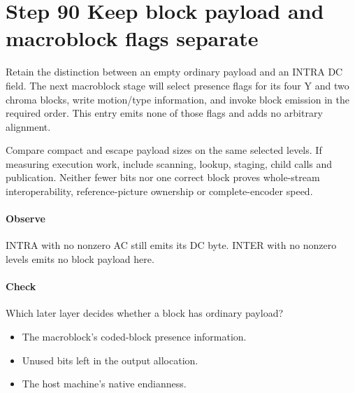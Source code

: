 \section{Step 90 Keep block payload and macroblock flags separate}\label{h263-coeff-s10}
Retain the distinction between an empty ordinary payload and an INTRA DC field.
The next macroblock stage will select presence flags for its four Y and two chroma
blocks, write motion/type information, and invoke block emission in the required
order. This entry emits none of those flags and adds no arbitrary alignment.

Compare compact and escape payload sizes on the same selected levels. If measuring
execution work, include scanning, lookup, staging, child calls and publication.
Neither fewer bits nor one correct block proves whole-stream interoperability,
reference-picture ownership or complete-encoder speed.

\paragraph{Observe} INTRA with no nonzero AC still emits its DC byte. INTER with
no nonzero levels emits no block payload here.
\paragraph{Check} Which later layer decides whether a block has ordinary payload?
\begin{itemize}
  \item[A.] The macroblock's coded-block presence information.
  \item[B.] Unused bits left in the output allocation.
  \item[C.] The host machine's native endianness.
\end{itemize}
